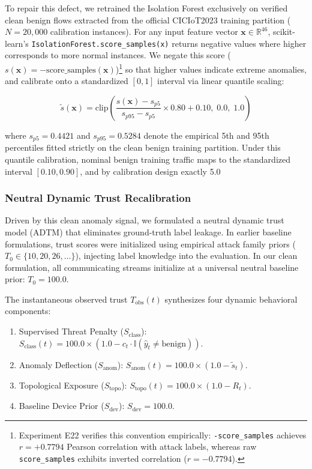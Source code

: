 \documentclass[journal,10pt,onecolumn]{IEEEtran}
\begin{document}
To repair this defect, we retrained the Isolation Forest exclusively on verified clean benign flows extracted from the official CICIoT2023 training partition ($N = 20,000$ calibration instances). For any input feature vector $\mathbf{x} \in \mathbb{R}^{46}$, scikit-learn's \texttt{IsolationForest.score_samples(x)} returns negative values where higher corresponds to more normal instances. We negate this score ($s(\mathbf{x}) = -\text{score\_samples}(\mathbf{x})$)\footnote{Experiment E22 verifies this convention empirically: \texttt{-score\_samples} achieves $r = +0.7794$ Pearson correlation with attack labels, whereas raw \texttt{score\_samples} exhibits inverted correlation ($r = -0.7794$).} so that higher values indicate extreme anomalies, and calibrate onto a standardized $[0, 1]$ interval via linear quantile scaling:

$$\tilde{s}(\mathbf{x}) = \text{clip}\left( \frac{s(\mathbf{x}) - s_{p5}}{s_{p95} - s_{p5}} \times 0.80 + 0.10, \; 0.0, \; 1.0 \right)$$

where $s_{p5} = 0.4421$ and $s_{p95} = 0.5284$ denote the empirical 5th and 95th percentiles fitted strictly on the clean benign training partition. Under this quantile calibration, nominal benign training traffic maps to the standardized interval $[0.10, 0.90]$, and by calibration design exactly 5.0%


\subsubsection{Neutral Dynamic Trust Recalibration}
Driven by this clean anomaly signal, we formulated a neutral dynamic trust model (ADTM) that eliminates ground-truth label leakage. In earlier baseline formulations, trust scores were initialized using empirical attack family priors ($T_0 \in \{10, 20, 26, \dots\}$), injecting label knowledge into the evaluation. In our clean formulation, all communicating streams initialize at a universal neutral baseline prior: $T_0 = 100.0$.

The instantaneous observed trust $T_{\text{obs}}(t)$ synthesizes four dynamic behavioral components:
\begin{enumerate}
  \item Supervised Threat Penalty ($S_{\text{class}}$): $S_{\text{class}}(t) = 100.0 \times (1.0 - c_t \cdot \mathbb{I}(\hat{y}_t \ne \text{benign}))$.
  \item Anomaly Deflection ($S_{\text{anom}}$): $S_{\text{anom}}(t) = 100.0 \times (1.0 - \tilde{s}_t)$.
  \item Topological Exposure ($S_{\text{topo}}$): $S_{\text{topo}}(t) = 100.0 \times (1.0 - R_t)$.
  \item Baseline Device Prior ($S_{\text{dev}}$): $S_{\text{dev}} = 100.0$.
\end{enumerate}
\end{document}
